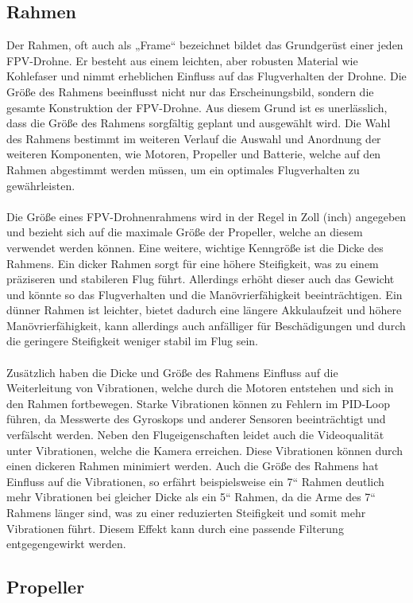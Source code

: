 \subsection[Rahmen]{Rahmen}
    Der Rahmen, oft auch als „Frame“ bezeichnet bildet das Grundgerüst einer jeden FPV-Drohne. Er besteht aus einem leichten, aber robusten Material wie Kohlefaser und nimmt erheblichen Einfluss auf das Flugverhalten der Drohne. Die Größe des Rahmens beeinflusst nicht nur das Erscheinungsbild, sondern die gesamte Konstruktion der FPV-Drohne. Aus diesem Grund ist es unerlässlich, dass die Größe des Rahmens sorgfältig geplant und ausgewählt wird. Die Wahl des Rahmens bestimmt im weiteren Verlauf die Auswahl und Anordnung der weiteren Komponenten, wie Motoren, Propeller und Batterie, welche auf den Rahmen abgestimmt werden müssen, um ein optimales Flugverhalten zu gewährleisten.
    \\ \\
    Die Größe eines FPV-Drohnenrahmens wird in der Regel in Zoll (inch) angegeben und bezieht sich auf die maximale Größe der Propeller, welche an diesem verwendet werden können. Eine weitere, wichtige Kenngröße ist die Dicke des Rahmens. Ein dicker Rahmen sorgt für eine höhere Steifigkeit, was zu einem präziseren und stabileren Flug führt. Allerdings erhöht dieser auch das Gewicht und könnte so das Flugverhalten und die Manövrierfähigkeit beeinträchtigen. Ein dünner Rahmen ist leichter, bietet dadurch eine längere Akkulaufzeit und höhere Manövrierfähigkeit, kann allerdings auch anfälliger für Beschädigungen und durch die geringere Steifigkeit weniger stabil im Flug sein.
    \\ \\
    Zusätzlich haben die Dicke und Größe des Rahmens Einfluss auf die Weiterleitung von Vibrationen, welche durch die Motoren entstehen und sich in den Rahmen fortbewegen. Starke Vibrationen können zu Fehlern im PID-Loop führen, da Messwerte des Gyroskops und anderer Sensoren beeinträchtigt und verfälscht werden. Neben den Flugeigenschaften leidet auch die Videoqualität unter Vibrationen, welche die Kamera erreichen. Diese Vibrationen können durch einen dickeren Rahmen minimiert werden. Auch die Größe des Rahmens hat Einfluss auf die Vibrationen, so erfährt beispielsweise ein 7“ Rahmen deutlich mehr Vibrationen bei gleicher Dicke als ein 5“ Rahmen, da die Arme des 7“ Rahmens länger sind, was zu einer reduzierten Steifigkeit und somit mehr Vibrationen führt. Diesem Effekt kann durch eine passende Filterung entgegengewirkt werden.

\subsection[Propeller]{Propeller}